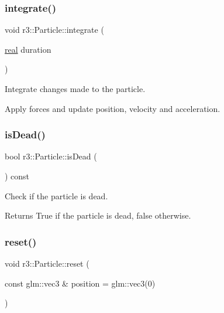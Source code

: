 \subsubsection{\texorpdfstring{integrate()}{integrate()}}
{\footnotesize\ttfamily void r3\+::\+Particle\+::integrate (\begin{DoxyParamCaption}\item[{\mbox{\hyperlink{namespacer3_ab2016b3e3f743fb735afce242f0dc1eb}{real}}}]{duration }\end{DoxyParamCaption})\hspace{0.3cm}{\ttfamily [virtual]}}



Integrate changes made to the particle. 

Apply forces and update position, velocity and acceleration. \mbox{\label{classr3_1_1_particle_aeeb9dd636d0851bc007ff718ef9140e9}} 
\subsubsection{\texorpdfstring{is\+Dead()}{isDead()}}
{\footnotesize\ttfamily bool r3\+::\+Particle\+::is\+Dead (\begin{DoxyParamCaption}{ }\end{DoxyParamCaption}) const}



Check if the particle is dead. 

\begin{DoxyReturn}{Returns}
True if the particle is dead, false otherwise. 
\end{DoxyReturn}
\mbox{\label{classr3_1_1_particle_a28335c3bee5a6956ec43653f3b26f84a}} 
\subsubsection{\texorpdfstring{reset()}{reset()}}
{\footnotesize\ttfamily void r3\+::\+Particle\+::reset (\begin{DoxyParamCaption}\item[{const glm\+::vec3 \&}]{position = {\ttfamily glm\+:\+:vec3(0)} }\end{DoxyParamCaption})}



